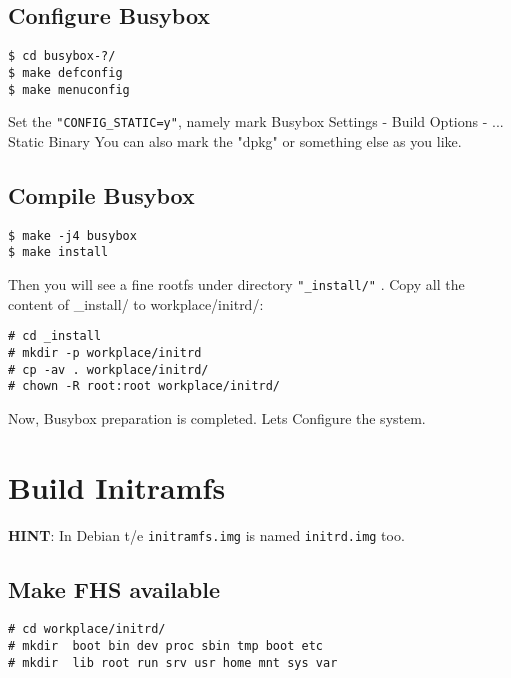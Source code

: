 \documentclass[10pt,a4paper]{article}
\begin{document}
\subsection{Configure Busybox}
\begin{framed}\begin{verbatim}
$ cd busybox-?/
$ make defconfig
$ make menuconfig
\end{verbatim}\end{framed}
Set the \texttt{"CONFIG\_STATIC=y"}, namely mark\newline
Busybox Settings - Build Options - ... Static Binary\newline
You can also mark the "dpkg" or something else as you like.

\subsection{Compile Busybox}
\begin{framed}\begin{verbatim}
$ make -j4 busybox
$ make install
\end{verbatim}\end{framed}
Then you will see a fine rootfs under directory \texttt{"\_install/"} .\newline
Copy all the content of \_install/ to workplace/initrd/:
\begin{framed}\begin{verbatim}
# cd _install
# mkdir -p workplace/initrd
# cp -av . workplace/initrd/
# chown -R root:root workplace/initrd/
\end{verbatim}\end{framed}
Now, Busybox preparation is completed. Lets Configure the system.

\section{Build Initramfs}
\textbf{HINT}: In Debian t/e \texttt{initramfs.img} is named \texttt{initrd.img} too.

\subsection{Make FHS available}
\begin{framed}\begin{verbatim}
# cd workplace/initrd/
# mkdir  boot bin dev proc sbin tmp boot etc 
# mkdir  lib root run srv usr home mnt sys var 
\end{verbatim}\end{framed}
\end{document}
